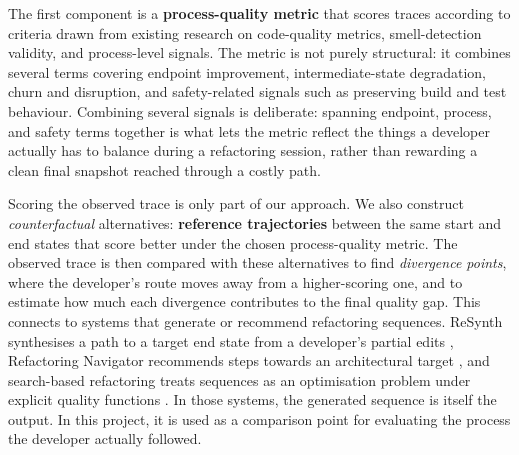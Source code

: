 The first component is a \textbf{process-quality metric} that scores traces according to criteria drawn from existing research on code-quality metrics, smell-detection validity, and process-level signals. The metric is not purely structural: it combines several terms covering endpoint improvement, intermediate-state degradation, churn and disruption, and safety-related signals such as preserving build and test behaviour. Combining several signals is deliberate: spanning endpoint, process, and safety terms together is what lets the metric reflect the things a developer actually has to balance during a refactoring session, rather than rewarding a clean final snapshot reached through a costly path.

Scoring the observed trace is only part of our approach. We also construct \emph{counterfactual} alternatives: \textbf{reference trajectories} between the same start and end states that score better under the chosen process-quality metric. The observed trace is then compared with these alternatives to find \emph{divergence points}, where the developer's route moves away from a higher-scoring one, and to estimate how much each divergence contributes to the final quality gap. This connects to systems that generate or recommend refactoring sequences. ReSynth synthesises a path to a target end state from a developer's partial edits \cite{raychev2013resynth}, Refactoring Navigator recommends steps towards an architectural target \cite{lin2016navigator}, and search-based refactoring treats sequences as an optimisation problem under explicit quality functions \cite{harman2007pareto,mohan2019manyobjective}. In those systems, the generated sequence is itself the output. In this project, it is used as a comparison point for evaluating the process the developer actually followed.

